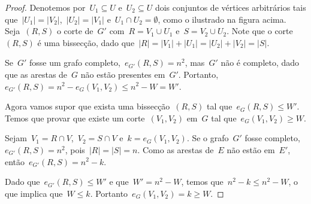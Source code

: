 \begin{proof}
		Denotemos por~${U_1\subseteq U}$ e~${U_2\subseteq U}$ dois conjuntos de vértices
		arbitrários
		tais que~${|U_1| = |V_2|}$,~${|U_2| = |V_1|}$ e~$U_1\cap U_2 = \emptyset$,
		como o ilustrado na figura acima.
		Seja~$(R,S)$ o corte de~$G'$ com~${R=V_1\cup U_1}$
		e~${S=V_2\cup U_2}$. 
		Note que o corte~$(R,S)$ é uma bissecção, dado 
		que~${|R| = |V_1| + |U_1| = |U_2|+|V_2| = |S|}$.

		Se~$G'$ fosse um grafo completo,~${e_{G'}(R,S) = n^2}$,
		mas~$G'$ não é completo, dado que as arestas 
		de~$G$ não estão presentes em~$G'$.
		Portanto,~${e_{G'}(R,S) = n^2 - e_G(V_1,V_2)\le n^2-W = W'}$.


		\bigskip

		Agora vamos supor que 
		exista uma bissecção~$(R,S)$ tal que~${e_G(R,S)\le W'}$.
		Temos que provar que existe um corte~$(V_1,V_2)$ em~$G$ tal 
		que~${e_G(V_1,V_2)\ge W}$.

		Sejam~${V_1 = R\cap V}$,~${V_2 = S\cap V}$
		e~${k = e_G(V_1,V_2)}$. 
		Se o grafo~$G'$ fosse completo,~${e_{G'}(R,S) = n^2}$,
		pois~${|R| = |S| = n}$.
		Como as arestas de~$E$ não estão em~$E'$,
		então~${e_{G'}(R, S) = n^2 - k}$.

		Dado que~$e_{G'}(R,S)\le W'$ e que~$W'= n^2-W$, 
		temos que~$n^2-k \le n^2 -W$,
		o que implica que~$W\le k$.
		Portanto~$e_G(V_1,V_2) = k \ge W$.
	\end{proof}

\bigskip
\bigskip
